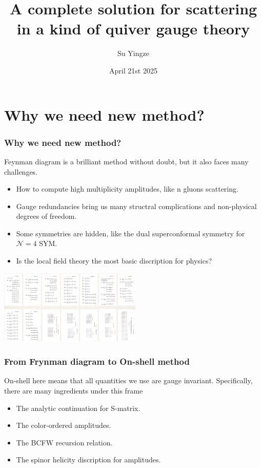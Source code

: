 \documentclass{beamer}
\title[Application of BCFW]{A complete solution for scattering in a kind of quiver gauge theory}
\author{Su Yingze}
\institute{Nagoya University}
\date[4 21st 2025]{April 21st 2025}
\begin{document}
\frame{\titlepage}
\section{Why we need new method?}
\begin{frame}
    \frametitle{Why we need new method?}
    Feynman diagram is a brilliant method without doubt, but it also faces many challenges.
    \begin{itemize}
        \item How to compute high multiplicity amplitudes, like n gluons scattering.
        \item Gauge redundancies bring us many structral complications and non-physical degrees of freedom.
        \item Some symmetries are hidden, like the dual superconformal symmetry for $\mathcal{N}=4$ SYM.
        \item Is the local field theory the most basic discription for physics?
    \end{itemize}
    \includegraphics{Picture1.png}
\end{frame}
\begin{frame}
    \frametitle{From Frynman diagram to On-shell method}
    On-shell here means that all quantities we use are gauge invariant.
    Specifically, there are many ingredients under this frame
    \begin{itemize}
        \item The analytic continuation for S-matrix.
        \item The color-ordered amplitudes.
        \item The BCFW recursion relation.
        \item The spinor helicity discription for amplitudes.
    \end{itemize}
\end{frame}
\end{document}
